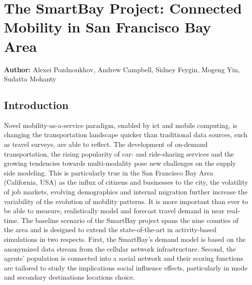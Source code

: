 \chapter{The SmartBay Project: Connected Mobility in San Francisco Bay Area}
\label{ch:sanfrancisco}
\hfill \textbf{Author:} Alexei Pozdnoukhov, Andrew Campbell, Sidney Feygin, Mogeng Yin, Sudatta Mohanty

\section{Introduction}
Novel mobility-as-a-service paradigm, enabled by \gls{ict} and mobile computing, is changing the transportation landscape quicker than traditional data sources, such as travel surveys, are able to reflect. The development of on-demand transportation, the rising popularity of car- and ride-sharing services and the growing tendencies towards multi-modality pose new challenges on the supply side modeling. This is particularly true in the San Francisco Bay Area (California, USA) as the influx of citizens and businesses to the city, the volatility of job markets, evolving demographics and internal migration further increase the variability of the evolution of mobility patterns. It is more important than ever to be able to measure, realistically model and forecast travel demand in near real-time. The baseline scenario of the SmartBay project spans the nine counties of the area and is designed to extend the state-of-the-art in activity-based simulations in two respects. First, the SmartBay’s demand model is based on the anonymized data stream from the cellular network infrastructure. Second, the agents' population is connected into a social network and their scoring functions are tailored to study the implications social influence effects, particularly in mode and secondary destinations locations choice. 

